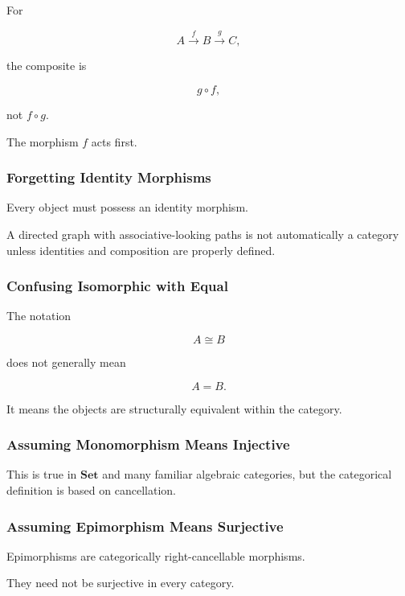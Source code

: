 For

\[ A\xrightarrow{f}B\xrightarrow{g}C, \]

the composite is

\[ g\circ f, \]

not \(f\circ g\).

The morphism \(f\) acts first.

\subsubsection{Forgetting Identity Morphisms}

Every object must possess an identity morphism.

A directed graph with associative-looking paths is not automatically a
category unless identities and composition are properly defined.

\subsubsection{Confusing Isomorphic with Equal}

The notation

\[ A\cong B \]

does not generally mean

\[ A=B. \]

It means the objects are structurally equivalent within the category.

\subsubsection{Assuming Monomorphism Means Injective}

This is true in \(\mathbf{Set}\) and many familiar algebraic categories, but
the categorical definition is based on cancellation.

\subsubsection{Assuming Epimorphism Means Surjective}

Epimorphisms are categorically right-cancellable morphisms.

They need not be surjective in every category.


